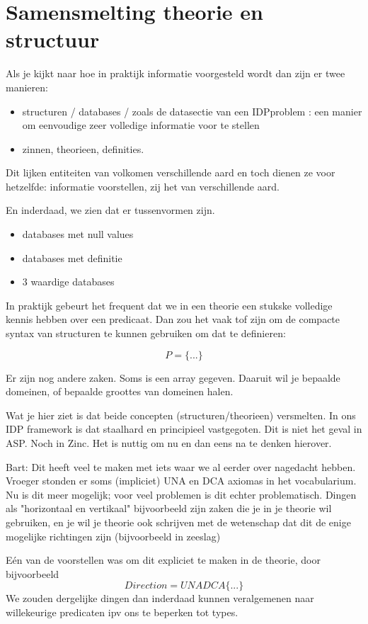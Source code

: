 \documentclass{article}
\begin{document}
\section{Samensmelting theorie en structuur}
Als je kijkt naar hoe in praktijk informatie voorgesteld wordt dan zijn er twee manieren:
\begin{itemize}
  \item structuren / databases / zoals de datasectie van een IDPproblem : een manier om eenvoudige zeer volledige informatie voor te stellen
  \item zinnen, theorieen, definities. 
\end{itemize}

Dit lijken entiteiten van volkomen verschillende aard en toch dienen ze voor hetzelfde: informatie voorstellen, zij het van verschillende aard.

En inderdaad, we zien dat er tussenvormen zijn.
\begin{itemize}
  \item databases met null values
  \item databases met definitie
  \item 3 waardige databases 
\end{itemize}

In praktijk gebeurt het frequent dat we in een theorie een stukske volledige kennis hebben over een predicaat.  Dan zou het vaak tof zijn om de compacte syntax van structuren te kunnen gebruiken om dat te definieren:

\[P = \{ ... \}\]

Er zijn nog andere zaken. Soms is een array gegeven. Daaruit wil je bepaalde domeinen, of bepaalde groottes van domeinen halen.

Wat je hier ziet is dat beide concepten (structuren/theorieen) versmelten. In ons IDP framework is dat staalhard en principieel vastgegoten. Dit is niet het geval in ASP. Noch in Zinc. Het is nuttig om nu en dan eens na te denken hierover.

Bart:
Dit heeft veel te maken met iets waar we al eerder over nagedacht hebben.  Vroeger stonden er soms (impliciet) UNA en DCA axiomas in het vocabularium.  Nu is dit meer mogelijk; voor veel problemen is dit echter problematisch.  Dingen als "horizontaal en vertikaal" bijvoorbeeld zijn zaken die je in je theorie wil gebruiken, en je wil je theorie ook schrijven met de wetenschap dat dit de enige mogelijke richtingen zijn (bijvoorbeeld in zeeslag)

Eén van de voorstellen was om dit expliciet te maken in de theorie, door bijvoorbeeld
\[Direction = UNADCA\{...\}\]
We zouden dergelijke dingen dan inderdaad kunnen veralgemenen naar willekeurige predicaten ipv ons te beperken tot types.
\end{document}
